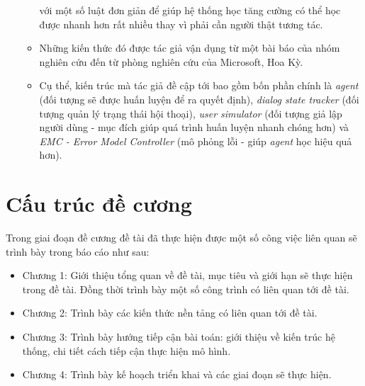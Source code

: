 \begin{itemize}
\begin{itemize}
        với một số luật đơn giản để giúp hệ thống học tăng cường có thể
        học được nhanh hơn rất nhiều thay vì phải cần người thật tương tác.
        \item Những kiến thức đó được tác giả vận dụng từ một bài báo
        \cite{endtoend} của nhóm nghiên cứu đến từ phòng nghiên cứu
        của Microsoft, Hoa Kỳ.
        \item Cụ thể, kiến trúc mà tác giả đề cập tới bao gồm bốn phần chính là
        \textit{agent} (đối tượng sẽ được huấn luyện để ra quyết định),
        \textit{dialog state tracker} (đối tượng quản lý trạng thái hội thoại),
        \textit{user simulator} (đối tượng giả lập người dùng -
        mục đích giúp quá trình huấn luyện nhanh chóng hơn) và
        \textit{EMC - Error Model Controller} (mô phỏng lỗi -
        giúp \textit{agent} học hiệu quả hơn).
    \end{itemize}
\end{itemize}

\section{Cấu trúc đề cương}
Trong giai đoạn đề cương đề tài đã thực hiện được một số công việc
liên quan sẽ trình bày trong báo cáo như sau:

\begin{itemize}
\item Chương 1: Giới thiệu tổng quan về đề tài, mục tiêu và giới hạn
sẽ thực hiện trong đề tài. Đồng thời trình bày một số công trình
có liên quan tới đề tài.
\item Chương 2: Trình bày các kiến thức nền tảng có liên quan tới đề tài.
\item Chương 3: Trình bày hướng tiếp cận bài toán: giới thiệu về
kiến trúc hệ thống, chi tiết cách tiếp cận thực hiện mô hình.
\item Chương 4: Trình bày kế hoạch triển khai và các giai đoạn sẽ thực hiện.
\end{itemize}
